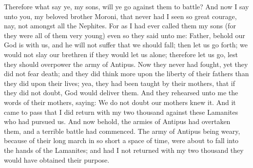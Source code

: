 \bverse \iffalse Therefore what say ye, my sons, will ye go against them to battle? \fi
Therefore what say ye, my sons, will ye go against them to battle?
\bverse \iffalse And now I say unto you, my beloved brother Moroni, that never had I seen so great courage, nay, not amongst all the Nephites. \fi
And now I say unto you, my beloved brother Moroni, that never had I seen so great courage, nay, not amongst all the Nephites.
\bverse \iffalse For as I had ever called them my sons (for they were all of them very young) even so they said unto me: Father, behold our God is with us, and he will not suffer that we should fall; then let us go forth; we would not slay our brethren if they would let us alone; therefore let us go, lest they should overpower the army of Antipus. \fi
For as I had ever called them my sons (for they were all of them very young) even so they said unto me: Father, behold our God is with us, and he will not suffer that we should fall; then let us go forth; we would not slay our brethren if they would let us alone; therefore let us go, lest they should overpower the army of Antipus.
\bverse \iffalse Now they never had fought, yet they did not fear death; and they did think more upon the liberty of their fathers than they did upon their lives; yea, they had been taught by their mothers, that if they did not doubt, God would deliver them. \fi
Now they never had fought, yet they did not fear death; and they did think more upon the liberty of their fathers than they did upon their lives; yea, they had been taught by their mothers, that if they did not doubt, God would deliver them.
\bverse \iffalse And they rehearsed unto me the words of their mothers, saying: We do not doubt our mothers knew it. \fi
And they rehearsed unto me the words of their mothers, saying: We do not doubt our mothers knew it.
\bverse \iffalse And it came to pass that I did return with my two thousand against these Lamanites who had pursued us. And now behold, the armies of Antipus had overtaken them, and a terrible battle had commenced. \fi
And it came to pass that I did return with my two thousand against these Lamanites who had pursued us. And now behold, the armies of Antipus had overtaken them, and a terrible battle had commenced.
\bverse \iffalse The army of Antipus being weary, because of their long march in so short a space of time, were about to fall into the hands of the Lamanites; and had I not returned with my two thousand they would have obtained their purpose. \fi
The army of Antipus being weary, because of their long march in so short a space of time, were about to fall into the hands of the Lamanites; and had I not returned with my two thousand they would have obtained their purpose.
